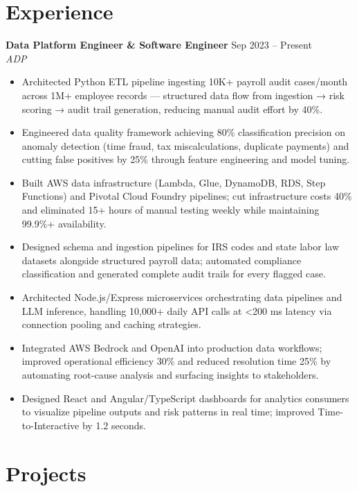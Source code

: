 \documentclass[10pt,letterpaper]{article}
\newcommand{\entry}[3]{%
  \vspace{3pt}\textbf{#1} \hfill #3 \\
  \textit{\small #2}\vspace{1pt}}
\begin{document}
\section{Experience}

\entry{Data Platform Engineer \& Software Engineer}{ADP}{Sep 2023 -- Present}
\begin{itemize}
  \item Architected Python ETL pipeline ingesting 10K+ payroll audit cases/month across 1M+ employee records --- structured data flow from ingestion → risk scoring → audit trail generation, reducing manual audit effort by 40\%.
  \item Engineered data quality framework achieving 80\% classification precision on anomaly detection (time fraud, tax miscalculations, duplicate payments) and cutting false positives by 25\% through feature engineering and model tuning.
  \item Built AWS data infrastructure (Lambda, Glue, DynamoDB, RDS, Step Functions) and Pivotal Cloud Foundry pipelines; cut infrastructure costs 40\% and eliminated 15+ hours of manual testing weekly while maintaining 99.9\%+ availability.
  \item Designed schema and ingestion pipelines for IRS codes and state labor law datasets alongside structured payroll data; automated compliance classification and generated complete audit trails for every flagged case.
  \item Architected Node.js/Express microservices orchestrating data pipelines and LLM inference, handling 10,000+ daily API calls at \textless{}200 ms latency via connection pooling and caching strategies.
  \item Integrated AWS Bedrock and OpenAI into production data workflows; improved operational efficiency 30\% and reduced resolution time 25\% by automating root-cause analysis and surfacing insights to stakeholders.
  \item Designed React and Angular/TypeScript dashboards for analytics consumers to visualize pipeline outputs and risk patterns in real time; improved Time-to-Interactive by 1.2 seconds.
\end{itemize}

\section{Projects}
\end{document}
